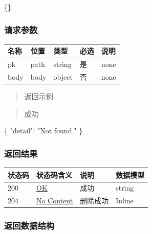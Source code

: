 \documentclass[
]{article}
\newenvironment{Shaded}{}{}
\newcommand{\DataTypeTok}[1]{\textcolor[rgb]{0.56,0.13,0.00}{#1}}
\newcommand{\FunctionTok}[1]{\textcolor[rgb]{0.02,0.16,0.49}{#1}}
\newcommand{\StringTok}[1]{\textcolor[rgb]{0.25,0.44,0.63}{#1}}
\begin{document}
\begin{Shaded}
\begin{Highlighting}[]
\FunctionTok{\{\}}
\end{Highlighting}
\end{Shaded}

\hypertarget{ux8bf7ux6c42ux53c2ux6570-32}{%
\subsubsection{请求参数}\label{ux8bf7ux6c42ux53c2ux6570-32}}

\begin{longtable}[]{@{}lllll@{}}
\toprule
名称 & 位置 & 类型 & 必选 & 说明 \\
\midrule
\endhead
pk & path & string & 是 & none \\
body & body & object & 否 & none \\
\bottomrule
\end{longtable}

\begin{quote}
返回示例
\end{quote}

\begin{quote}
成功
\end{quote}

\begin{Shaded}
\begin{Highlighting}[]
\FunctionTok{\{}
  \DataTypeTok{"detail"}\FunctionTok{:} \StringTok{"Not found."}
\FunctionTok{\}}
\end{Highlighting}
\end{Shaded}

\hypertarget{ux8fd4ux56deux7ed3ux679c-34}{%
\subsubsection{返回结果}\label{ux8fd4ux56deux7ed3ux679c-34}}

\begin{longtable}[]{@{}llll@{}}
\toprule
状态码 & 状态码含义 & 说明 & 数据模型 \\
\midrule
\endhead
200 & \href{https://tools.ietf.org/html/rfc7231\#section-6.3.1}{OK} &
成功 & string \\
204 & \href{https://tools.ietf.org/html/rfc7231\#section-6.3.5}{No
Content} & 删除成功 & Inline \\
\bottomrule
\end{longtable}

\hypertarget{ux8fd4ux56deux6570ux636eux7ed3ux6784-27}{%
\subsubsection{返回数据结构}\label{ux8fd4ux56deux6570ux636eux7ed3ux6784-27}}
\end{document}
